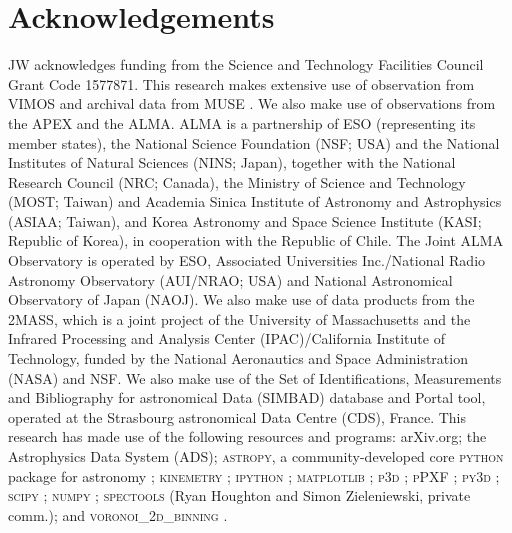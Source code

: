 \documentclass[a4paper,fleqn,usenatbib]{mnras}
\begin{document}
\section*{Acknowledgements}
JW acknowledges funding from the Science and Technology Facilities Council Grant Code 1577871. This research makes extensive use of observation from VIMOS \citep{LeFevre2003} and archival data from MUSE \citep{Bacon2010}. We also make use of observations from the APEX \citep{Gusten2006} and the ALMA. ALMA is a partnership of ESO (representing its member states), the National Science Foundation (NSF; USA) and the National Institutes of Natural Sciences (NINS; Japan), together with the National Research Council (NRC; Canada), the Ministry of Science and Technology (MOST; Taiwan) and Academia Sinica Institute of Astronomy and Astrophysics (ASIAA; Taiwan), and Korea Astronomy and Space Science Institute (KASI; Republic of Korea), in cooperation with the Republic of Chile. The Joint ALMA Observatory is operated by ESO, Associated Universities Inc./National Radio Astronomy Observatory (AUI/NRAO; USA) and National Astronomical Observatory of Japan (NAOJ). We also make use of data products from the 2MASS, which is a joint project of the University of Massachusetts and the Infrared Processing and Analysis Center (IPAC)/California Institute of Technology, funded by the National Aeronautics and Space Administration (NASA) and NSF. We also make use of the Set of Identifications, Measurements and Bibliography for astronomical Data (SIMBAD) database and Portal tool, operated at the Strasbourg astronomical Data Centre (CDS), France. This research has made use of the following resources and programs: arXiv.org; the Astrophysics Data System (ADS); \textsc{astropy}, a community-developed core \textsc{python} package for astronomy \citep{TheAstropyCollaboration2013}; \textsc{kinemetry} \citep{Krajnovic2006}; \textsc{ipython} \citep{Perez2007}; \textsc{matplotlib} \citep{Hunter2007}; \textsc{p3d} \citep{Sandin2010, Sandin2011}; \textsc{pPXF} \citep{Cappellari2004}; \textsc{py3d} \citep{Sanchez2011, Husemann2013, Husemann2014}; \textsc{scipy} \citep{Oliphant2007, Millman2011}; \textsc{numpy} \citep{VanderWalt2011}; \textsc{spectools} (Ryan Houghton and Simon Zieleniewski, private comm.); and \textsc{voronoi\_2d\_binning} \citep[including the SAURON colourmaps; ][]{Cappellari2003}.




\end{document}
